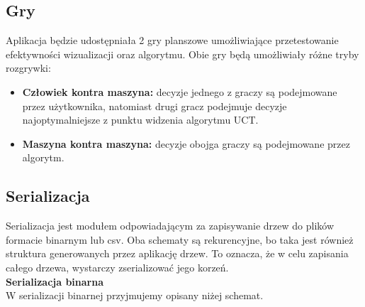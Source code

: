 \documentclass{article}
\begin{document}
	\subsection{Gry}
	Aplikacja będzie udostępniała 2 gry planszowe umożliwiające przetestowanie efektywności wizualizacji oraz algorytmu. Obie gry będą umożliwiały różne tryby rozgrywki: \\
	
	\begin{itemize}
		\item \textbf{Człowiek kontra maszyna:} decyzje jednego z graczy są podejmowane przez użytkownika, natomiast drugi gracz podejmuje decyzje najoptymalniejsze z punktu widzenia algorytmu UCT.
		\item \textbf{Maszyna kontra maszyna:} decyzje obojga graczy są podejmowane przez algorytm. \\ 
	\end{itemize}
	
	\clearpage
	
	\subsection{Serializacja}
	Serializacja jest modułem odpowiadającym za zapisywanie drzew do plików formacie binarnym lub csv. Oba schematy są rekurencyjne, bo taka jest również struktura generowanych przez aplikację drzew. To oznacza, że w celu zapisania całego drzewa, wystarczy zserializować jego korzeń.\\
	
	\noindent \textbf{\large Serializacja binarna} \\
	W serializacji binarnej przyjmujemy opisany niżej schemat.\\
\end{document}
